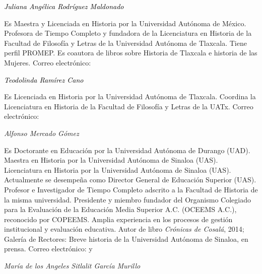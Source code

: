 \bigskip

{ 
\textit{\textcolor{black}{Juliana Angélica Rodríguez Maldonado}}}

{ 
Es Maestra y Licenciada en Historia por la Universidad Autónoma de México.
Profesora de Tiempo Completo y fundadora de la Licenciatura en Historia de
la Facultad de Filosofía y Letras de la Universidad Autónoma de Tlaxcala.
Tiene perfil PROMEP. Es coautora de libros sobre Historia de Tlaxcala e
historia de las Mujeres. Correo electrónico:
\href{mailto:angelicaromal@hotmail.com}{}}


\bigskip

{ 
\textit{\textcolor{black}{Teodolinda Ramírez Cano}}}

{ 
Es Licenciada en Historia por la Universidad Autónoma de Tlaxcala. Coordina
la Licenciatura en Historia de la Facultad de Filosofía y Letras de la
UATx. Correo electrónico:
\href{mailto:juliaju16@gmail.com}{}}


\bigskip


\bigskip

{ 
\textit{Alfonso Mercado Gómez}}

{ 
Es Doctorante en Educación por la Universidad Autónoma de Durango (UAD).
Maestra en Historia por la Universidad Autónoma de Sinaloa (UAS).
Licenciatura en Historia por la Universidad Autónoma de Sinaloa
(UAS).\textbf{ }Actualmente se desempeña como Director General de Educación
Superior (UAS). Profesor e Investigador de Tiempo Completo adscrito a la
Facultad de Historia de la misma universidad. Presidente y miembro fundador
del Organismo Colegiado para la Evaluación de la Educación Media Superior
A.C. (OCEEMS A.C.), reconocido por COPEEMS. Amplia experiencia en los
procesos de gestión institucional y evaluación educativa. Autor de libro
\textit{Crónicas de Cosalá}, 2014; Galería de Rectores: Breve historia de
la Universidad Autónoma de Sinaloa, en prensa. Correo electrónico:
\href{mailto:alfonsomercado@uas.edu.mx}{}
y
\href{mailto:Alfonso.uas@hotmail.com}{}}


\bigskip

{ 
\textit{María de los Angeles Sitlalit García Murillo}}

